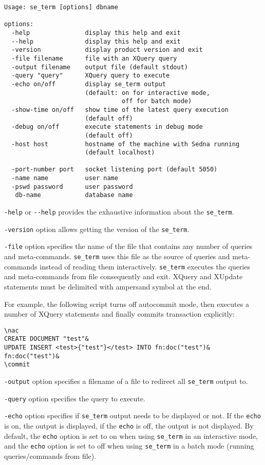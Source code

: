 \documentclass[a4paper,12pt]{article}
\begin{document}
\small{
\begin{verbatim}
Usage: se_term [options] dbname

options:
  -help               display this help and exit
  --help              display this help and exit
  -version            display product version and exit
  -file filename      file with an XQuery query
  -output filename    output file (default stdout)
  -query "query"      XQuery query to execute
  -echo on/off        display se_term output
                      (default: on for interactive mode,
                                off for batch mode)
  -show-time on/off   show time of the latest query execution
                      (default off)
  -debug on/off       execute statements in debug mode
                      (default off)
  -host host          hostname of the machine with Sedna running
                      (default localhost)

  -port-number port   socket listening port (default 5050)
  -name name          user name
  -pswd password      user password
   db-name            database name
\end{verbatim}}

\verb!-help! or \verb!--help! provides the exhaustive information about the
\verb!se_term!.

\verb!-version! option allows getting the version of the \verb!se_term!.

\verb!-file! option specifies the name of the file that contains any number of
queries and meta-commands. \verb!se_term! uses this file as the source of
queries and meta-commands instead of reading them interactively. \verb!se_term!
executes the queries and meta-commands from file consequently and exit. XQuery
and XUpdate statements must be delimited with ampersand symbol at the end.

For example, the following script turns off autocommit mode, then executes a
number of XQuery statements and finally commits transaction explicitly:

\small{
\begin{verbatim}
\nac
CREATE DOCUMENT "test"&
UPDATE INSERT <test>{"test"}</test> INTO fn:doc("test")&
fn:doc("test")&
\commit
\end{verbatim}}

\verb!-output! option specifies a filename of a file to redirect all
\verb!se_term! output to.

\verb!-query! option specifies the query to execute.

\verb!-echo! option specifies if \verb!se_term! output needs to be displayed or
not. If the \verb!echo! is on, the output is displayed, if the \verb!echo! is
off, the output is not displayed. By default, the \verb!echo! option is set to
on when using \verb!se_term! in an interactive mode, and the \verb!echo! option
is set to off when using \verb!se_term! in a batch mode (running
queries/commands from file).
\end{document}
